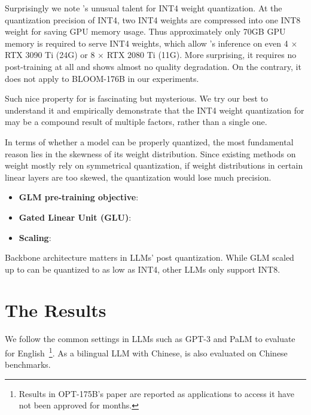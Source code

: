 {Surprisingly we note \glm's unusual talent for INT4 weight quantization.
At the quantization precision of INT4, two INT4 weights are compressed into one INT8 weight for saving GPU memory usage.
Thus approximately only 70GB GPU memory is required to serve INT4 \glm weights, which allow \glm's inference on even 4 $\times$ RTX 3090 Ti (24G) or 8 $\times$ RTX 2080 Ti (11G).
More surprising, it requires no post-training at all and shows almost no quality degradation.
On the contrary, it does not apply to BLOOM-176B in our experiments.

Such nice property for \glm is fascinating but mysterious.
We try our best to understand it and empirically demonstrate that the INT4 weight quantization for \glm may be a compound result of multiple factors, rather than a single one.

In terms of whether a model can be properly quantized, the most fundamental reason lies in the skewness of its weight distribution.
Since existing methods on weight mostly rely on symmetrical quantization, if weight distributions in certain linear layers are too skewed, the quantization would lose much precision.
\begin{itemize}[leftmargin=*,itemsep=0pt,parsep=0.2em,topsep=0.0em,partopsep=0.0em]
    \item \textbf{GLM pre-training objective}: 
    \item \textbf{Gated Linear Unit (GLU)}:
    \item \textbf{Scaling}:
\end{itemize}

\begin{insight}
\rm Backbone architecture matters in LLMs' post quantization. While GLM scaled up to \glm can be quantized to as low as INT4, other LLMs only support INT8.
\end{insight}

} 

\section{The Results}
\label{sec:results}

We follow the common settings in LLMs such as GPT-3 and PaLM to evaluate \glm for English~\footnote{\small Results in OPT-175B's paper are reported as applications to access it have not been approved for months.}. 
As a bilingual LLM with Chinese, \glm is also evaluated on Chinese benchmarks. 

